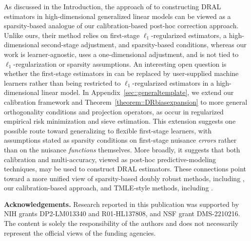 \documentclass[11pt]{article}
\theoremstyle{plain}
\begin{document}
{\color{purple} As discussed in the Introduction, the approach of \cite{liu2023root} to constructing DRAL estimators in high-dimensional generalized linear models can be viewed as a sparsity-based analogue of our calibration-based post-hoc correction approach. Unlike ours, their method relies on first-stage \(\ell_1\)-regularized estimators, a high-dimensional second-stage adjustment, and sparsity-based conditions, whereas our work is learner-agnostic, uses a one-dimensional adjustment, and is not tied to \(\ell_1\)-regularization or sparsity assumptions. An interesting open question is whether the first-stage estimators in \cite{liu2023root} can be replaced by user-supplied machine learners rather than being restricted to \(\ell_1\)-regularized estimators in a high-dimensional linear model. In Appendix~\ref{sec::generaltemplate}, we extend our calibration framework and Theorem~\ref{theorem::DRbiasexpansion} to more general orthogonality conditions and projection operators, as occur in regularized empirical risk minimization and sieve estimation. This extension suggests one possible route toward generalizing \cite{liu2023root} to flexible first-stage learners, with assumptions stated as sparsity conditions on first-stage nuisance \emph{errors} rather than on the nuisance \emph{functions} themselves. More broadly, it suggests that both calibration and multi-accuracy, viewed as post-hoc predictive-modeling techniques, may be used to construct DRAL estimators. These connections point toward a more unified view of sparsity-based doubly robust methods, including \citealp{liu2023root}, our calibration-based approach, and TMLE-style methods, including \citealp{benkeser2017doubly}. }


 \hspace{0.5cm}

\noindent\textbf{Acknowledgements.} Research reported in this publication was supported by NIH grants DP2-LM013340 and  R01-HL137808, and NSF grant DMS-2210216. The content is solely the responsibility of the authors and does not necessarily represent the official views of the funding agencies. 

 


\singlespacing

 

 
 

 
\end{document}
